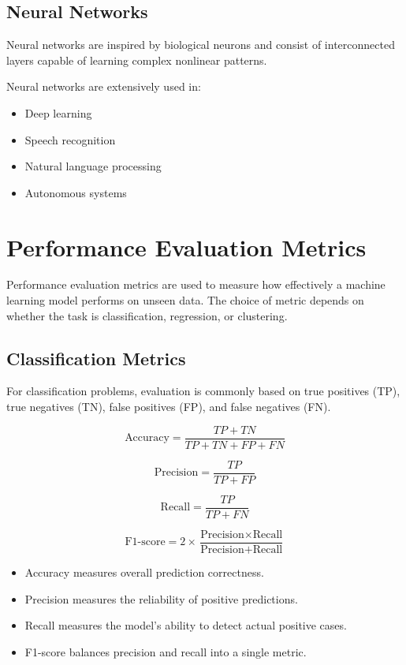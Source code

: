 \documentclass[11pt,a4paper]{article}
\begin{document}
\subsection{Neural Networks}

Neural networks are inspired by biological neurons and consist of interconnected layers capable of learning complex nonlinear patterns.

Neural networks are extensively used in:
\begin{itemize}
    \item Deep learning
    \item Speech recognition
    \item Natural language processing
    \item Autonomous systems
\end{itemize}


\section{Performance Evaluation Metrics}

Performance evaluation metrics are used to measure how effectively a machine learning model performs on unseen data. The choice of metric depends on whether the task is classification, regression, or clustering.

\subsection{Classification Metrics}

For classification problems, evaluation is commonly based on true positives (TP), true negatives (TN), false positives (FP), and false negatives (FN).

\[
\text{Accuracy}=\frac{TP+TN}{TP+TN+FP+FN}
\]

\[
\text{Precision}=\frac{TP}{TP+FP}
\]

\[
\text{Recall}=\frac{TP}{TP+FN}
\]

\[
\text{F1-score}=2\times\frac{\text{Precision}\times\text{Recall}}{\text{Precision}+\text{Recall}}
\]

\begin{itemize}
    \item Accuracy measures overall prediction correctness.
    \item Precision measures the reliability of positive predictions.
    \item Recall measures the model's ability to detect actual positive cases.
    \item F1-score balances precision and recall into a single metric.
\end{itemize}
\end{document}
